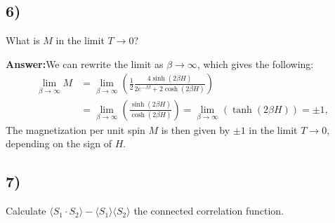 \documentclass[a4paper]{article}
\newcommand{\newparagraph}{\vspace{.5cm}\noindent}
\newcommand{\average}[1]{\langle #1 \rangle}
\begin{document}
\begin{comment}
    &= - k_bT\left[2\beta e^{-\beta J }\sinh\left(\beta[H_1 - H_2]\right) + \beta\right]\cdot\tanh\left[2e^{-\beta J}\cosh\left(\beta[H_2 - H_1]\right) + \beta(H_1 + H_2)\right].
\end{align*}One has that $H_1 = H_2 = H$ and thus:
\begin{align*}
    M &= \frac{1}{2}\left(\average{S_1} + \average{S_2}\right)\\
    &= -\frac{k_bT}{2}\left(\left[\beta\right]\tanh\left[2e^{-\beta J} + 2H\beta\right] + \left[\beta\right]\tanh\left[2e^{-\beta J} + 2H\beta\right]\right)\\
    &= -\tanh\left[2e^{-\beta J} + 2H\beta\right]
\end{align*}
\end{comment}

\subsection*{6)}
What is $M$ in the limit $T\to 0$?

\newparagraph
\textbf{Answer:}We can rewrite the limit as $\beta\to\infty$, which gives the following:
\begin{align*}
    \lim_{\beta\to\infty}M&= \lim_{\beta\to\infty}\left(\frac{1}{2}\frac{4 \sinh(2\beta H)}{2e^{-J\beta} + 2\cosh(2\beta H)}\right)\\
    &= \lim_{\beta\to\infty}\left(\frac{\sinh(2\beta H)}{\cosh(2\beta H)}\right) = \lim_{\beta\to\infty}\left(\tanh(2\beta H)\right) = \pm 1,
\end{align*}The magnetization per unit spin $M$ is then given by $\pm 1$ in the limit $T\to 0$, depending on the sign of $H$.

\subsection*{7)}
Calculate $\average{S_1 \cdot S_2} - \average{S_1}\average{S_2}$ the connected correlation function.
\end{document}
